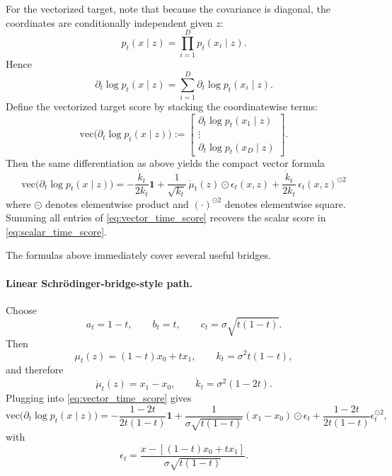 For the vectorized target, note that because the covariance is diagonal, the coordinates are conditionally independent given $z$:
\begin{equation}
p_t(x \mid z)=\prod_{i=1}^D p_t(x_i \mid z).
\end{equation}
Hence
\begin{equation}
\partial_t \log p_t(x \mid z)
=
\sum_{i=1}^D \partial_t \log p_t(x_i \mid z).
\end{equation}
Define the vectorized target score by stacking the coordinatewise terms:
\begin{equation}
\mathrm{vec}\!\bigl(\partial_t \log p_t(x \mid z)\bigr)
:=
\begin{bmatrix}
\partial_t \log p_t(x_1 \mid z) \\
\vdots \\
\partial_t \log p_t(x_D \mid z)
\end{bmatrix}.
\end{equation}
Then the same differentiation as above yields the compact vector formula
\begin{equation}
\boxed{
\mathrm{vec}\!\bigl(\partial_t \log p_t(x \mid z)\bigr)
=
-\frac{\dot k_t}{2k_t}\mathbf 1
+
\frac{1}{\sqrt{k_t}}\,\dot\mu_t(z)\odot \epsilon_t(x,z)
+
\frac{\dot k_t}{2k_t}\,\epsilon_t(x,z)^{\odot 2}
}
\label{eq:vector_time_score}
\end{equation}
where $\odot$ denotes elementwise product and $(\cdot)^{\odot 2}$ denotes elementwise square. Summing all entries of \eqref{eq:vector_time_score} recovers the scalar score in \eqref{eq:scalar_time_score}.

The formulas above immediately cover several useful bridges.

\paragraph{Linear Schr\"odinger-bridge-style path.}
Choose
\begin{equation}
a_t = 1-t,
\qquad
b_t = t,
\qquad
c_t = \sigma \sqrt{t(1-t)}.
\end{equation}
Then
\begin{equation}
\mu_t(z) = (1-t)x_0 + t x_1,
\qquad
k_t = \sigma^2 t(1-t),
\end{equation}
and therefore
\begin{equation}
\dot \mu_t(z) = x_1-x_0,
\qquad
\dot k_t = \sigma^2(1-2t).
\end{equation}
Plugging into \eqref{eq:vector_time_score} gives
\begin{equation}
\mathrm{vec}\!\bigl(\partial_t \log p_t(x \mid z)\bigr)
=
-\frac{1-2t}{2t(1-t)}\mathbf 1
+
\frac{1}{\sigma\sqrt{t(1-t)}}(x_1-x_0)\odot \epsilon_t
+
\frac{1-2t}{2t(1-t)}\epsilon_t^{\odot 2},
\end{equation}
with
\begin{equation}
\epsilon_t
=
\frac{x-[(1-t)x_0+t x_1]}{\sigma\sqrt{t(1-t)}}.
\end{equation}

